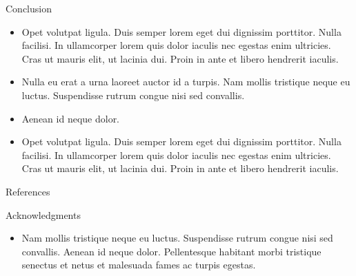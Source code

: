 \documentclass[final,hyperref={pdfpagelabels=false}]{beamer}
\begin{document}
\begin{frame}[t]
\begin{columns}[t]
\begin{column}{.465\textwidth}
\begin{block}{Conclusion}
\begin{itemize}
\item Opet volutpat ligula. Duis semper lorem eget dui dignissim porttitor. Nulla facilisi. In ullamcorper lorem quis dolor iaculis nec egestas enim ultricies. Cras ut mauris elit, ut lacinia dui. Proin in ante et libero hendrerit iaculis.
\item Nulla eu erat a urna laoreet auctor id a turpis. Nam mollis tristique neque eu luctus. Suspendisse rutrum congue nisi sed convallis. 
\item Aenean id neque dolor.
\item Opet volutpat ligula. Duis semper lorem eget dui dignissim porttitor. Nulla facilisi. In ullamcorper lorem quis dolor iaculis nec egestas enim ultricies. Cras ut mauris elit, ut lacinia dui. Proin in ante et libero hendrerit iaculis.
\end{itemize}

\end{block}


\begin{block}{References}
        
\nocite{*} %
\small{
}

\end{block}


\begin{block}{Acknowledgments}

\begin{itemize}
\item Nam mollis tristique neque eu luctus. Suspendisse rutrum congue nisi sed convallis. Aenean id neque dolor. Pellentesque habitant morbi tristique senectus et netus et malesuada fames ac turpis egestas.
\end{itemize}

\end{block}



\end{column}
\end{columns}
\end{frame}
\end{document}
